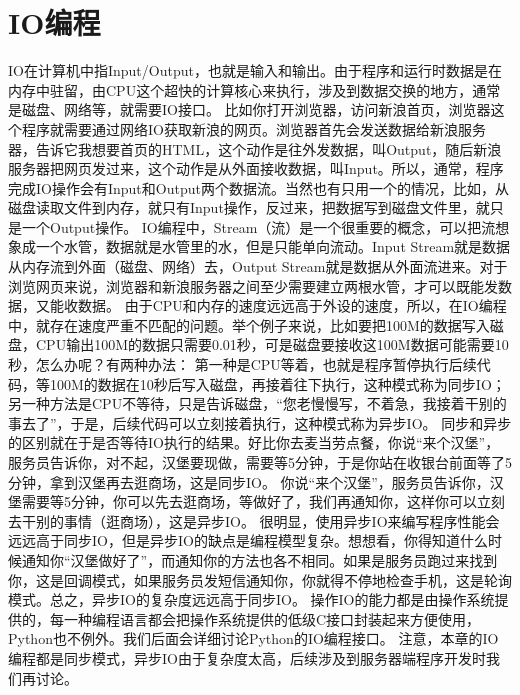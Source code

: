 \documentclass[twoside,11pt]{book}
\begin{document}
\section{IO编程}
IO在计算机中指Input/Output，也就是输入和输出。由于程序和运行时数据是在内存中驻留，由CPU这个超快的计算核心来执行，涉及到数据交换的地方，通常是磁盘、网络等，就需要IO接口。
比如你打开浏览器，访问新浪首页，浏览器这个程序就需要通过网络IO获取新浪的网页。浏览器首先会发送数据给新浪服务器，告诉它我想要首页的HTML，这个动作是往外发数据，叫Output，随后新浪服务器把网页发过来，这个动作是从外面接收数据，叫Input。所以，通常，程序完成IO操作会有Input和Output两个数据流。当然也有只用一个的情况，比如，从磁盘读取文件到内存，就只有Input操作，反过来，把数据写到磁盘文件里，就只是一个Output操作。
IO编程中，Stream（流）是一个很重要的概念，可以把流想象成一个水管，数据就是水管里的水，但是只能单向流动。Input Stream就是数据从内存流到外面（磁盘、网络）去，Output Stream就是数据从外面流进来。对于浏览网页来说，浏览器和新浪服务器之间至少需要建立两根水管，才可以既能发数据，又能收数据。
由于CPU和内存的速度远远高于外设的速度，所以，在IO编程中，就存在速度严重不匹配的问题。举个例子来说，比如要把100M的数据写入磁盘，CPU输出100M的数据只需要0.01秒，可是磁盘要接收这100M数据可能需要10秒，怎么办呢？有两种办法：
第一种是CPU等着，也就是程序暂停执行后续代码，等100M的数据在10秒后写入磁盘，再接着往下执行，这种模式称为同步IO；
另一种方法是CPU不等待，只是告诉磁盘，“您老慢慢写，不着急，我接着干别的事去了”，于是，后续代码可以立刻接着执行，这种模式称为异步IO。
同步和异步的区别就在于是否等待IO执行的结果。好比你去麦当劳点餐，你说“来个汉堡”，服务员告诉你，对不起，汉堡要现做，需要等5分钟，于是你站在收银台前面等了5分钟，拿到汉堡再去逛商场，这是同步IO。
你说“来个汉堡”，服务员告诉你，汉堡需要等5分钟，你可以先去逛商场，等做好了，我们再通知你，这样你可以立刻去干别的事情（逛商场），这是异步IO。
很明显，使用异步IO来编写程序性能会远远高于同步IO，但是异步IO的缺点是编程模型复杂。想想看，你得知道什么时候通知你“汉堡做好了”，而通知你的方法也各不相同。如果是服务员跑过来找到你，这是回调模式，如果服务员发短信通知你，你就得不停地检查手机，这是轮询模式。总之，异步IO的复杂度远远高于同步IO。
操作IO的能力都是由操作系统提供的，每一种编程语言都会把操作系统提供的低级C接口封装起来方便使用，Python也不例外。我们后面会详细讨论Python的IO编程接口。
注意，本章的IO编程都是同步模式，异步IO由于复杂度太高，后续涉及到服务器端程序开发时我们再讨论。
\end{document}
